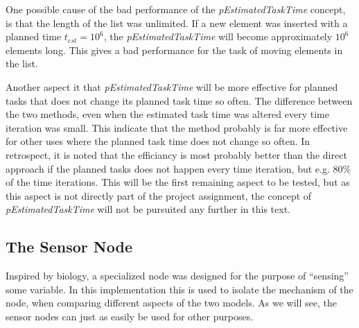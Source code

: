 	One possible cause of the bad performance of the \emph{pEstimatedTaskTime} concept, is that the length of the list was unlimited.
	If a new element was inserted with a planned time $t_{est} = 10^6$, the \emph{pEstimatedTaskTime} will become approximately $10^6$ elements long.
	This gives a bad performance for the task of moving elements in the list.

	Another aspect it that \emph{pEstimatedTaskTime} will be more effective for planned tasks that does not change its planned task time so often. 
	The difference between the two methods, even when the estimated task time was altered every time iteration was small.
	This indicate that the method probably is far more effective for other uses where the planned task time does not change so often.
	In retrospect, it is noted that the efficiancy is most probably better than the direct approach if the planned tasks does not happen every time iteration, but e.g. $80\%$ of the time iterations.
	This will be the first remaining aspect to be tested, but as this aspect is not directly part of the project assignment, the concept of \emph{pEstimatedTaskTime} will not be pursuited any further in this text.




	\subsection{The Sensor Node}
	\label{ssecTheSensorNode}
	Inspired by biology, a specialized node was designed for the purpose of ``sensing'' some variable.
	In this implementation this is used to isolate the mechanism of the node, when comparing different aspects of the two models.
	As we will see, the sensor nodes can just as easily be used for other purposes.

